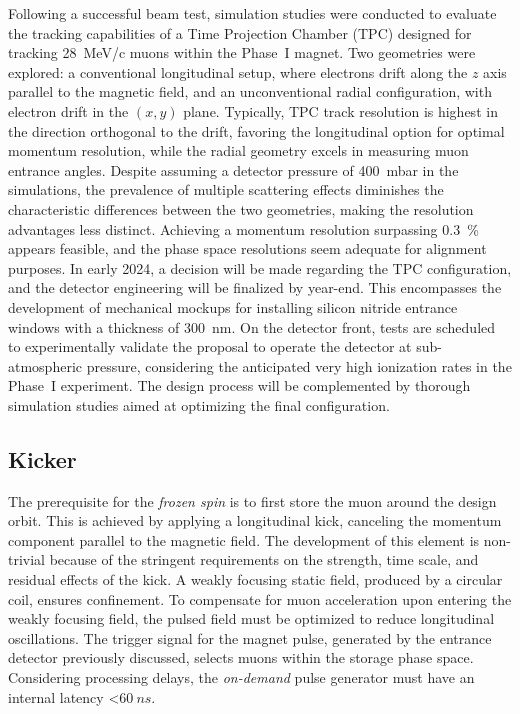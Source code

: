 \begin{refsection}
        \noindent
        Following a successful beam test, simulation studies were conducted to evaluate the tracking capabilities of a Time Projection Chamber (TPC) designed for tracking \SI{28}{MeV/c} muons within the Phase~I magnet. 
        Two geometries were explored: a conventional longitudinal setup, where electrons drift along the $z$ axis parallel to the magnetic field, and an unconventional radial configuration, with electron drift in the $(x,y)$ plane. 
        Typically, TPC track resolution is highest in the direction orthogonal to the drift, favoring the longitudinal option for optimal momentum resolution, while the radial geometry excels in measuring muon entrance angles. 
        Despite assuming a detector pressure of \SI{400}{\milli\bar} in the simulations, the prevalence of multiple scattering effects diminishes the characteristic differences between the two geometries, making the resolution advantages less distinct.
        Achieving a momentum resolution surpassing \SI{0.3}{\percent} appears feasible, and the phase space resolutions seem adequate for alignment purposes. 
        In early 2024, a decision will be made regarding the TPC configuration, and the detector engineering will be finalized by year-end. 
        This encompasses the development of mechanical mockups for installing silicon nitride entrance windows with a thickness of \SI{300}{\nano\meter}. 
        On the detector front, tests are scheduled to experimentally validate the proposal to operate the detector at sub-atmospheric pressure, considering the anticipated very high ionization rates in the Phase~I experiment. 
        The design process will be complemented by thorough simulation studies aimed at optimizing the final configuration.
        
    \subsection{Kicker}
    \label{sec:muEDM:kicker}
        The prerequisite for the \textit{frozen spin} is to first store the muon around the design orbit.
        This is achieved by applying a longitudinal kick, canceling the momentum component parallel to the magnetic field.
        The development of this element is non-trivial because of the stringent requirements on the strength, time scale, and residual effects of the kick.
        A weakly focusing static field, produced by a circular coil, ensures confinement. 
        To compensate for muon acceleration upon entering the weakly focusing field, the pulsed field must be optimized to reduce longitudinal oscillations.
        The trigger signal for the magnet pulse, generated by the entrance detector previously discussed, selects muons within the storage phase space. 
        Considering processing delays, the \textit{on-demand} pulse generator must have an internal latency <$\SI{60}{ns}$.


\end{refsection}
